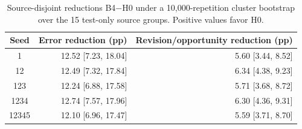 \begin{table}[t]
\centering
\caption{Source-disjoint reductions B4$-$H0 under a 10,000-repetition cluster bootstrap over the 15 test-only source groups. Positive values favor H0.}
\label{tab:source-disjoint-ci}
\begin{tabular}{crr}
\toprule
Seed & Error reduction (pp) & Revision/opportunity reduction (pp) \\
\midrule
1 & 12.52 [7.23, 18.04] & 5.60 [3.44, 8.52] \\
12 & 12.49 [7.32, 17.84] & 6.34 [4.38, 9.23] \\
123 & 12.24 [6.88, 17.58] & 5.71 [3.68, 8.72] \\
1234 & 12.74 [7.57, 17.96] & 6.30 [4.36, 9.31] \\
12345 & 12.10 [6.96, 17.47] & 5.59 [3.71, 8.70] \\
\bottomrule
\end{tabular}
\end{table}
